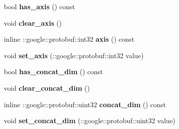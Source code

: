 \begin{DoxyCompactItemize}
\mbox{\label{classcaffe_1_1_concat_parameter_a5f0ec0f7df4e1616858f9e339ae28d4d}} 
bool {\bfseries has\+\_\+axis} () const
\item 
\mbox{\label{classcaffe_1_1_concat_parameter_aa667987a8da285cb5409ce7879f60564}} 
void {\bfseries clear\+\_\+axis} ()
\item 
\mbox{\label{classcaffe_1_1_concat_parameter_a21295e720f2d44be0091bb89d2934897}} 
inline \+::google\+::protobuf\+::int32 {\bfseries axis} () const
\item 
\mbox{\label{classcaffe_1_1_concat_parameter_a6d025989922a9ec64014b421ff1f649f}} 
void {\bfseries set\+\_\+axis} (\+::google\+::protobuf\+::int32 value)
\item 
\mbox{\label{classcaffe_1_1_concat_parameter_a07f17e6e972d14432fbfc82fb94618db}} 
bool {\bfseries has\+\_\+concat\+\_\+dim} () const
\item 
\mbox{\label{classcaffe_1_1_concat_parameter_af1e66bf9a750cafeb8fdad78f7f9e9ea}} 
void {\bfseries clear\+\_\+concat\+\_\+dim} ()
\item 
\mbox{\label{classcaffe_1_1_concat_parameter_a29f1f478277f7c305f68843b72225eaf}} 
inline \+::google\+::protobuf\+::uint32 {\bfseries concat\+\_\+dim} () const
\item 
\mbox{\label{classcaffe_1_1_concat_parameter_a02ff0084d1171c03168a3a1822594ba0}} 
void {\bfseries set\+\_\+concat\+\_\+dim} (\+::google\+::protobuf\+::uint32 value)
\end{DoxyCompactItemize}
